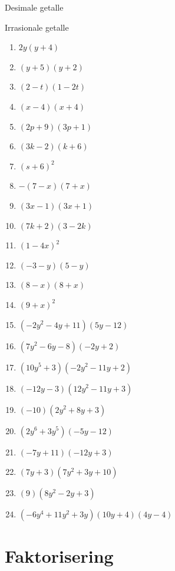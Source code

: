 \begin{Aktiwiteit}{Desimale getalle}
\begin{aktiwiteit}{Irrasionale getalle}
\begin{exercises}{}
\begin{multicols}{2}
\begin{enumerate}[label=\textbf{\arabic*}., itemsep=5pt]
\item $2y(y+4)$ 
\item $(y+5)(y+2) $
\item $(2-t)(1-2t)$
\item $(x-4)(x+4)$
\item $ (2p+9)(3p+1)$
\item $(3k-2)(k+6)$
\item $(s+6)^2$
\item $-(7-x)(7+x)$
\item $(3x-1)(3x+1)$
\item $(7k+2)(3-2k)$
\item $(1-4x)^2$
\item $(-3-y)(5-y)$
\item $(8-x)(8+x)$
\item $(9+x)^2$
\item$(-2{y}^{2}-4y+11)(5y-12)$ 
\item$(7{y}^{2}-6y-8)(-2y+2)$%
\item$(10{y}^{5}+3)(-2{y}^{2}-11y+2)$ 
\item$(-12y-3)(12{y}^{2}-11y+3)$%
\item$(-10)(2{y}^{2}+8y+3)$ 
\item$(2{y}^{6}+3{y}^{5})(-5y-12)$%
\item$(-7y+11)(-12y+3)$%
\item$(7y+3)(7{y}^{2}+3y+10)$%
\item$(9)(8{y}^{2}-2y+3)$ 
\item$(-6{y}^{4}+11{y}^{2}+3y)(10y+4)(4y-4)$ 
\end{enumerate}
\end{multicols}
\end{exercises}





\section{Faktorisering}


\end{aktiwiteit}
\end{Aktiwiteit}
